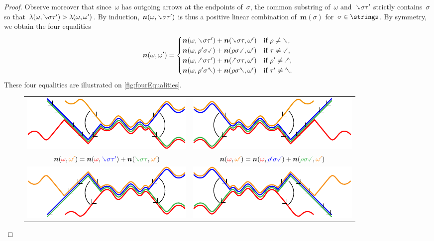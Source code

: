 \documentclass{amsart}
\theoremstyle{definition}
\renewcommand{\b}[1]{{\boldsymbol{#1}}} %
\newcommand{\red}{\color{red}} %
\newcommand{\blue}{\color{blue}} %
\newcommand{\orange}{\color{orange}} %
\newcommand{\green}{\color{green}} %
\newcommand{\hL}{\text{\rotatebox[origin=c]{180}{\checked}}}
\newcommand{\hR}{\text{\rotatebox[origin=c]{180}{\reflectbox{\checked}}}}
\newcommand{\cL}{\text{\reflectbox{\checked}}}
\newcommand{\cR}{\text{\checked}}
\begin{document}
\begin{proof}
\pagebreak
Observe moreover that since~$\omega$ has outgoing arrows at the endpoints of~$\sigma$, the common substring of~$\omega$ and~$\cL \sigma \tau'$ strictly contains~$\sigma$ so that $\lambda(\omega, \cL \sigma \tau') > \lambda(\omega, \omega')$.
By induction, $\b{n}(\omega, \cL \sigma \tau')$ is thus a positive linear combination of~$\b{m}(\sigma)$ for~$\sigma \in \strings$.
%
By symmetry, we obtain the four equalities
\[
\b{n}(\omega, \omega') = 
\begin{cases}
\b{n}(\omega, \cL \sigma \tau') + \b{n}(\cL \sigma \tau, \omega') & \text{if } \rho \ne \cL, \\
\b{n}(\omega, \rho' \sigma \cR) + \b{n}(\rho \sigma \cR, \omega') & \text{if } \tau \ne \cR, \\
\b{n}(\omega, \hL \sigma \tau') + \b{n}(\hL \sigma \tau, \omega') & \text{if } \rho' \ne \hL, \\
\b{n}(\omega, \rho' \sigma \hR) + \b{n}(\rho \sigma \hR, \omega') & \text{if } \tau' \ne \hR.
\end{cases}
\]
These four equalities are illustrated on \cref{fig:fourEqualities}.
%
\begin{figure}[t]
	\capstart
	\begin{adjustbox}{center}
    	\begin{tabular}{c@{\qquad}c}
    		\includegraphics[scale=1.2]{fourEqualities1} & \includegraphics[scale=1.2]{fourEqualities2} \\
    		$\b{n}({\red \omega}, {\orange \omega'}) = \b{n}({\red \omega}, {\blue \cL \sigma \tau'}) + \b{n}({\green \cL \sigma \tau}, {\orange \omega'})$ & $\b{n}({\red \omega}, {\orange \omega'}) = \b{n}({\red \omega}, {\blue \rho' \sigma \cR}) + \b{n}({\green \rho \sigma \cR}, {\orange \omega'})$ \\[.4cm]
    		\includegraphics[scale=1.2]{fourEqualities3} & \includegraphics[scale=1.2]{fourEqualities4} \\

\end{tabular}
\end{adjustbox}
\end{figure}
\end{proof}
\end{document}
